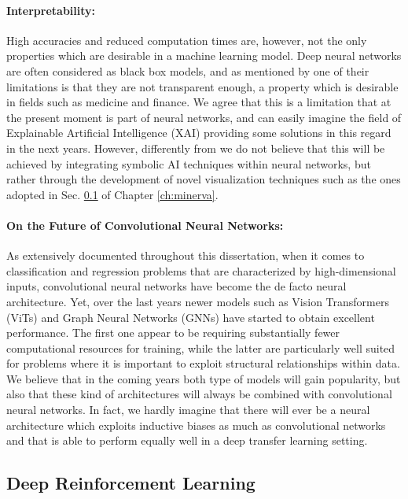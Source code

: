 \paragraph{Interpretability:}
High accuracies and reduced computation times are, however, not the only properties which are desirable in a machine learning model. Deep neural networks are often considered as black box models, and as mentioned by \citet{marcus2018deep} one of their limitations is that they are not transparent enough, a property which is desirable in fields such as medicine and finance. We agree that this is a limitation that at the present moment is part of neural networks, and can easily imagine the field of Explainable Artificial Intelligence (XAI) providing some solutions in this regard in the next years. However, differently from \cite{adadi2021survey} we do not believe that this will be achieved by integrating symbolic AI techniques within neural networks, but rather through the development of novel visualization techniques such as the ones adopted in Sec. \ref{} of Chapter \ref{ch:minerva}. 

\paragraph{On the Future of Convolutional Neural Networks:}
As extensively documented throughout this dissertation, when it comes to classification and regression problems that are characterized by high-dimensional inputs, convolutional neural networks have become the de facto neural architecture. Yet, over the last years newer models such as Vision Transformers (ViTs) \cite{dosovitskiy2020image} and Graph Neural Networks (GNNs) \cite{scarselli2008graph,kipf2016semi,garcia2017few,scarselli2005graph} have started to obtain excellent performance. The first one appear to be requiring substantially fewer computational resources for training, while the latter are particularly well suited for problems where it is important to exploit structural relationships within data. We believe that in the coming years both type of models will gain popularity, but also that these kind of architectures will always be combined with convolutional neural networks. In fact, we hardly imagine that there will ever be a neural architecture which exploits inductive biases as much as convolutional networks and that is able to perform equally well in a deep transfer learning setting.   

\subsection{Deep Reinforcement Learning}
